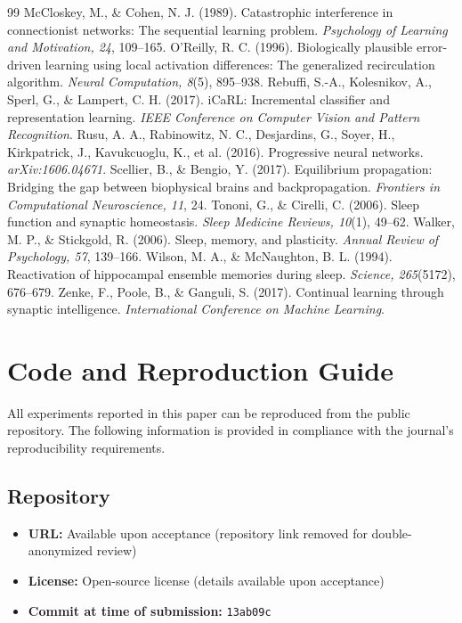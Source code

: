 \documentclass[11pt]{article}
\begin{document}
\begin{thebibliography}{99}
 McCloskey, M., \& Cohen, N. J. (1989). Catastrophic interference in connectionist networks: The sequential learning problem. \textit{Psychology of Learning and Motivation, 24}, 109--165.
 O'Reilly, R. C. (1996). Biologically plausible error-driven learning using local activation differences: The generalized recirculation algorithm. \textit{Neural Computation, 8}(5), 895--938.
 Rebuffi, S.-A., Kolesnikov, A., Sperl, G., \& Lampert, C. H. (2017). iCaRL: Incremental classifier and representation learning. \textit{IEEE Conference on Computer Vision and Pattern Recognition}.
 Rusu, A. A., Rabinowitz, N. C., Desjardins, G., Soyer, H., Kirkpatrick, J., Kavukcuoglu, K., et al. (2016). Progressive neural networks. \textit{arXiv:1606.04671}.
 Scellier, B., \& Bengio, Y. (2017). Equilibrium propagation: Bridging the gap between biophysical brains and backpropagation. \textit{Frontiers in Computational Neuroscience, 11}, 24.
 Tononi, G., \& Cirelli, C. (2006). Sleep function and synaptic homeostasis. \textit{Sleep Medicine Reviews, 10}(1), 49--62.
 Walker, M. P., \& Stickgold, R. (2006). Sleep, memory, and plasticity. \textit{Annual Review of Psychology, 57}, 139--166.
 Wilson, M. A., \& McNaughton, B. L. (1994). Reactivation of hippocampal ensemble memories during sleep. \textit{Science, 265}(5172), 676--679.
 Zenke, F., Poole, B., \& Ganguli, S. (2017). Continual learning through synaptic intelligence. \textit{International Conference on Machine Learning}.
\end{thebibliography}

\appendix
\section{Code and Reproduction Guide}
\label{app:reproduction}

All experiments reported in this paper can be reproduced from the public repository. The following information is provided in compliance with the journal's reproducibility requirements.

\subsection{Repository}
\begin{itemize}[leftmargin=*]
    \item \textbf{URL:} Available upon acceptance (repository link removed for double-anonymized review)
    \item \textbf{License:} Open-source license (details available upon acceptance)
    \item \textbf{Commit at time of submission:} \texttt{13ab09c}
\end{itemize}
\end{document}
